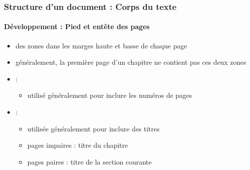 \documentclass[xcolor=table]{beamer}
\begin{document}
\begin{frame}
\frametitle{Structure d'un document : Corps du texte}
\framesubtitle{Développement : Pied et entête des pages}

\begin{minipage}{0.60\textwidth}
	\begin{itemize}
		\item des zones dans les marges haute et basse de chaque page 
		\item généralement, la première page d'un chapitre ne contient pas ces deux zones 
		\item {} : 
		\begin{itemize}
			\item utilisé généralement pour inclure les numéros de pages
		\end{itemize}
		
		\item {} : 
		\begin{itemize}
			\item utilisée généralement pour inclure des titres
			\item pages impaires : titre du chapitre
			\item pages paires : titre de la section courante
		\end{itemize}
	\end{itemize}
\end{minipage}
\begin{minipage}{0.38\textwidth}
\end{minipage}

\end{frame}
\end{document}
